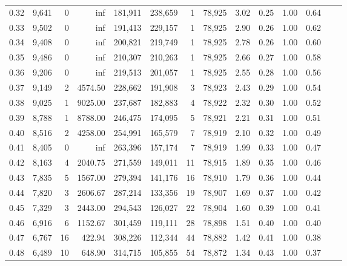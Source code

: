 \begin{tabular}{rrrrrrrrrrrrrr}
0.32 &  9,641 &      0 &      inf &  181,911 &  238,659 &       1 &  78,925 &  3.02 &  0.25 &  1.00 &      0.64 \\
0.33 &  9,502 &      0 &      inf &  191,413 &  229,157 &       1 &  78,925 &  2.90 &  0.26 &  1.00 &      0.62 \\
0.34 &  9,408 &      0 &      inf &  200,821 &  219,749 &       1 &  78,925 &  2.78 &  0.26 &  1.00 &      0.60 \\
0.35 &  9,486 &      0 &      inf &  210,307 &  210,263 &       1 &  78,925 &  2.66 &  0.27 &  1.00 &      0.58 \\
0.36 &  9,206 &      0 &      inf &  219,513 &  201,057 &       1 &  78,925 &  2.55 &  0.28 &  1.00 &      0.56 \\
0.37 &  9,149 &      2 &  4574.50 &  228,662 &  191,908 &       3 &  78,923 &  2.43 &  0.29 &  1.00 &      0.54 \\
0.38 &  9,025 &      1 &  9025.00 &  237,687 &  182,883 &       4 &  78,922 &  2.32 &  0.30 &  1.00 &      0.52 \\
0.39 &  8,788 &      1 &  8788.00 &  246,475 &  174,095 &       5 &  78,921 &  2.21 &  0.31 &  1.00 &      0.51 \\
0.40 &  8,516 &      2 &  4258.00 &  254,991 &  165,579 &       7 &  78,919 &  2.10 &  0.32 &  1.00 &      0.49 \\
0.41 &  8,405 &      0 &      inf &  263,396 &  157,174 &       7 &  78,919 &  1.99 &  0.33 &  1.00 &      0.47 \\
0.42 &  8,163 &      4 &  2040.75 &  271,559 &  149,011 &      11 &  78,915 &  1.89 &  0.35 &  1.00 &      0.46 \\
0.43 &  7,835 &      5 &  1567.00 &  279,394 &  141,176 &      16 &  78,910 &  1.79 &  0.36 &  1.00 &      0.44 \\
0.44 &  7,820 &      3 &  2606.67 &  287,214 &  133,356 &      19 &  78,907 &  1.69 &  0.37 &  1.00 &      0.42 \\
0.45 &  7,329 &      3 &  2443.00 &  294,543 &  126,027 &      22 &  78,904 &  1.60 &  0.39 &  1.00 &      0.41 \\
0.46 &  6,916 &      6 &  1152.67 &  301,459 &  119,111 &      28 &  78,898 &  1.51 &  0.40 &  1.00 &      0.40 \\
0.47 &  6,767 &     16 &   422.94 &  308,226 &  112,344 &      44 &  78,882 &  1.42 &  0.41 &  1.00 &      0.38 \\
0.48 &  6,489 &     10 &   648.90 &  314,715 &  105,855 &      54 &  78,872 &  1.34 &  0.43 &  1.00 &      0.37 \\

\end{tabular}

